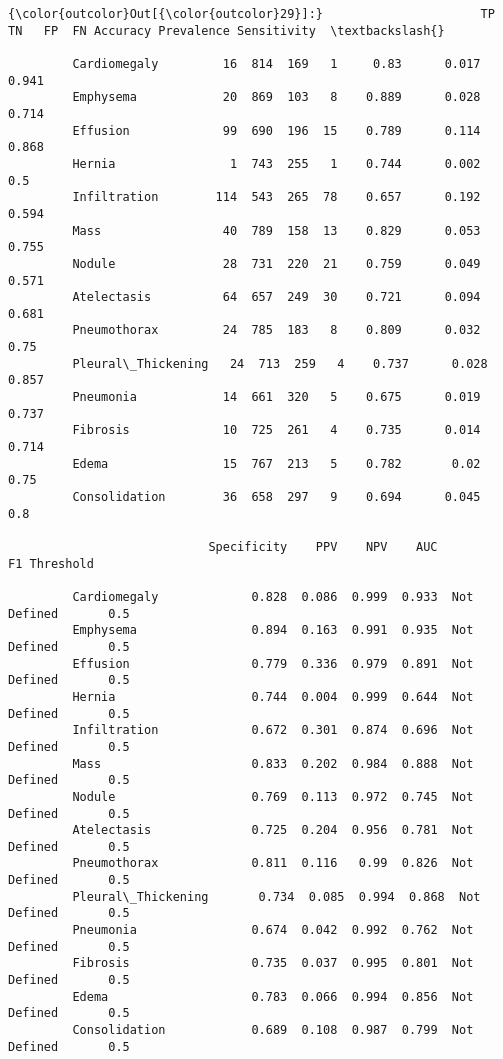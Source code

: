 \documentclass[11pt]{article}
\begin{document}
\begin{Verbatim}[commandchars=\\\{\}]
{\color{outcolor}Out[{\color{outcolor}29}]:}                      TP   TN   FP  FN Accuracy Prevalence Sensitivity  \textbackslash{}
                                                                                 
         Cardiomegaly         16  814  169   1     0.83      0.017       0.941   
         Emphysema            20  869  103   8    0.889      0.028       0.714   
         Effusion             99  690  196  15    0.789      0.114       0.868   
         Hernia                1  743  255   1    0.744      0.002         0.5   
         Infiltration        114  543  265  78    0.657      0.192       0.594   
         Mass                 40  789  158  13    0.829      0.053       0.755   
         Nodule               28  731  220  21    0.759      0.049       0.571   
         Atelectasis          64  657  249  30    0.721      0.094       0.681   
         Pneumothorax         24  785  183   8    0.809      0.032        0.75   
         Pleural\_Thickening   24  713  259   4    0.737      0.028       0.857   
         Pneumonia            14  661  320   5    0.675      0.019       0.737   
         Fibrosis             10  725  261   4    0.735      0.014       0.714   
         Edema                15  767  213   5    0.782       0.02        0.75   
         Consolidation        36  658  297   9    0.694      0.045         0.8   
         
                            Specificity    PPV    NPV    AUC           F1 Threshold  
                                                                                     
         Cardiomegaly             0.828  0.086  0.999  0.933  Not Defined       0.5  
         Emphysema                0.894  0.163  0.991  0.935  Not Defined       0.5  
         Effusion                 0.779  0.336  0.979  0.891  Not Defined       0.5  
         Hernia                   0.744  0.004  0.999  0.644  Not Defined       0.5  
         Infiltration             0.672  0.301  0.874  0.696  Not Defined       0.5  
         Mass                     0.833  0.202  0.984  0.888  Not Defined       0.5  
         Nodule                   0.769  0.113  0.972  0.745  Not Defined       0.5  
         Atelectasis              0.725  0.204  0.956  0.781  Not Defined       0.5  
         Pneumothorax             0.811  0.116   0.99  0.826  Not Defined       0.5  
         Pleural\_Thickening       0.734  0.085  0.994  0.868  Not Defined       0.5  
         Pneumonia                0.674  0.042  0.992  0.762  Not Defined       0.5  
         Fibrosis                 0.735  0.037  0.995  0.801  Not Defined       0.5  
         Edema                    0.783  0.066  0.994  0.856  Not Defined       0.5  
         Consolidation            0.689  0.108  0.987  0.799  Not Defined       0.5  
\end{Verbatim}
            
\end{document}
